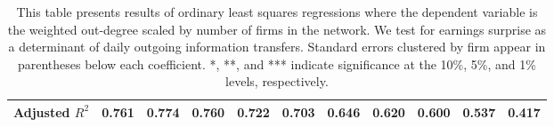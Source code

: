\begin{table}
{\begin{tabular}{rrrrrrrrrrr}
\multicolumn{1}{|l|}{Adjusted $R^2$} &
  \multicolumn{1}{c|}{0.761} &
  \multicolumn{1}{c|}{0.774} &
  \multicolumn{1}{c|}{0.760} &
  \multicolumn{1}{c|}{0.722} &
  \multicolumn{1}{c|}{0.703} &
  \multicolumn{1}{c|}{0.646} &
  \multicolumn{1}{c|}{0.620} &
  \multicolumn{1}{c|}{0.600} &
  \multicolumn{1}{c|}{0.537} &
  \multicolumn{1}{c|}{0.417} \\ \hline
\end{tabular}}
\caption{This table presents results of ordinary least squares regressions where the dependent variable is the weighted out-degree scaled by number of firms in the network.  We test for earnings surprise as a determinant of daily outgoing information transfers.  Standard errors clustered by firm appear in parentheses below each coefficient.  *, **, and *** indicate significance at the 10\%, 5\%, and 1\% levels, respectively. }
\label{tab:TEDetOutDeg}
\end{table}


